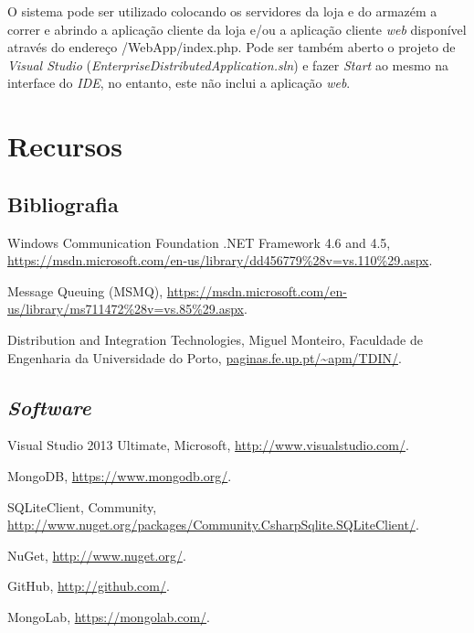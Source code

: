 \documentclass[12pt]{article}
\begin{document}
O sistema pode ser utilizado colocando os servidores da loja e do armazém a correr e abrindo a aplicação cliente da loja e/ou a aplicação cliente \textit{web} disponível através do endereço /WebApp/index.php. Pode ser também aberto o projeto de \textit{Visual Studio} (\textit{EnterpriseDistributedApplication.sln}) e fazer \textit{Start} ao mesmo na interface do \textit{IDE}, no entanto, este não inclui a aplicação \textit{web}.

\section{Recursos}

\subsection{Bibliografia}
\begin{description}
\item Windows Communication Foundation .NET Framework 4.6 and 4.5, \url{https://msdn.microsoft.com/en-us/library/dd456779\%28v=vs.110\%29.aspx}.
\item Message Queuing (MSMQ), \url{https://msdn.microsoft.com/en-us/library/ms711472\%28v=vs.85\%29.aspx}.
\item Distribution and Integration Technologies, Miguel Monteiro, Faculdade de Engenharia da Universidade do Porto, \url{paginas.fe.up.pt/~apm/TDIN/}.
\end{description}
\subsection{\it{Software}}
\begin{description}
\item Visual Studio 2013 Ultimate, Microsoft, \url{http://www.visualstudio.com/}.
\item MongoDB, \url{https://www.mongodb.org/}.
\item SQLiteClient, Community, \url{http://www.nuget.org/packages/Community.CsharpSqlite.SQLiteClient/}.
\item NuGet, \url{http://www.nuget.org/}.
\item GitHub, \url{http://github.com/}.
\item MongoLab, \url{https://mongolab.com/}.
\end{description}
\end{document}
